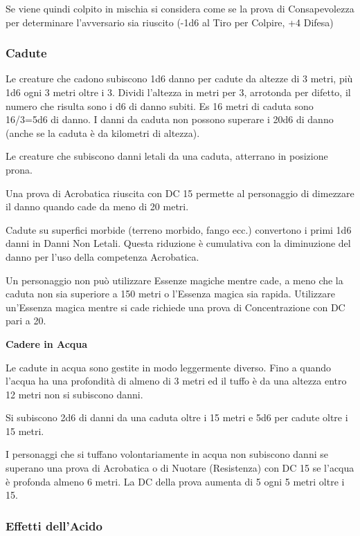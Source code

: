 \documentclass[a4paper,11pt,twoside,openany]{book}
\begin{document}
{Se viene quindi colpito in mischia si considera come se la prova di Consapevolezza per determinare l'avversario sia riuscito (-1d6 al Tiro per Colpire, +4 Difesa)

\subsubsection{Cadute}

\label{cadute}

Le creature che cadono subiscono 1d6 danno per cadute da altezze di 3 metri, più 1d6 ogni 3 metri oltre i 3. Dividi l'altezza in metri per 3, arrotonda per difetto, il numero che risulta sono i d6 di danno subiti. Es 16 metri di caduta sono 16/3=5d6 di danno. I danni da caduta non possono superare i 20d6 di danno (anche se la caduta è da kilometri di altezza).

Le creature che subiscono danni letali da una caduta, atterrano in posizione prona.

Una prova di Acrobatica riuscita con DC 15 permette al personaggio di dimezzare il danno quando cade da meno di 20 metri.

Cadute su superfici morbide (terreno morbido, fango ecc.) convertono i primi 1d6 danni in Danni Non Letali. Questa riduzione è cumulativa con la diminuzione del danno per l'uso della competenza Acrobatica.

Un personaggio non può utilizzare Essenze magiche mentre cade, a meno che la caduta non sia superiore a 150 metri o l'Essenza magica sia rapida. Utilizzare un'Essenza magica mentre si cade richiede una prova di Concentrazione con DC pari a 20.

\textbf{Cadere in Acqua}

Le cadute in acqua sono gestite in modo leggermente diverso. Fino a quando l'acqua ha una profondità di almeno di 3 metri ed il tuffo è da una altezza entro 12 metri non si subiscono danni.

Si subiscono 2d6 di danni da una caduta oltre i 15 metri e 5d6 per cadute oltre i 15 metri.

I personaggi che si tuffano volontariamente in acqua non subiscono danni se superano una prova di Acrobatica o di Nuotare (Resistenza) con DC 15 se l'acqua è profonda almeno 6 metri. La DC della prova aumenta di 5 ogni 5 metri oltre i 15.

\subsubsection{Effetti dell'Acido}

}
\end{document}
